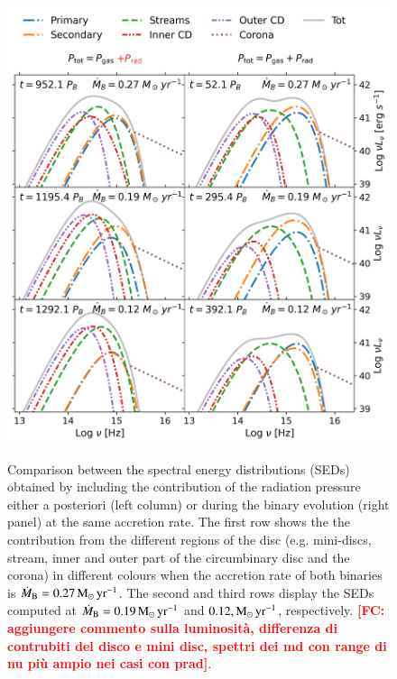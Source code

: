 \documentclass{aa}
\newcommand{\fc}[1]{\textcolor{red}{\bf [FC: #1]}}
\begin{document}
\begin{figure}[h]
    \begin{center}
    \includegraphics[width=\columnwidth]{Fig/Results/q1e0_prad_hr01_md001_rOut10_3921_PgasPrad_comparison.png} \\
    \caption{Comparison between the spectral energy distributions (SEDs) obtained by including the contribution of the radiation pressure either a posteriori (left column) or during the binary evolution (right panel) at the same accretion rate. The first row shows the the contribution from the different regions of the disc (e.g. mini-discs, stream, inner and outer part of the circumbinary disc and the corona) in different colours when the accretion rate of both binaries is $\dot M _{\rm B} = 0.27 \, \rm M_{\odot} \, yr^{-1}$. The second and third rows display the SEDs computed at $\dot M _{\rm B} = 0.19 \, \rm M_{\odot} \, yr^{-1}$ and $0.12 , \rm M_{\odot} \, yr^{-1}$, respectively.
\fc{aggiungere commento sulla luminosità, differenza di contrubiti del disco e mini disc, spettri dei md con range di nu più ampio nei casi con prad}.}
    \label{fig:SED}
    \end{center}
\end{figure}
\end{document}
